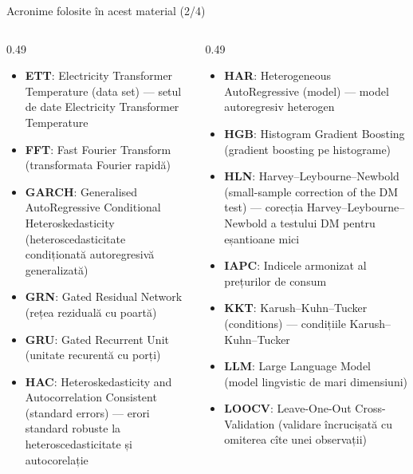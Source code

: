 \begin{frame}{Acronime folosite în acest material (2/4)}
\begin{columns}[T]
\begin{column}{0.49\textwidth}
\begin{itemize}\setlength{\itemsep}{0pt}
    \item \textbf{ETT}: Electricity Transformer Temperature (data set) — setul de date Electricity Transformer Temperature
    \item \textbf{FFT}: Fast Fourier Transform (transformata Fourier rapidă)
    \item \textbf{GARCH}: Generalised AutoRegressive Conditional Heteroskedasticity (heteroscedasticitate condiționată autoregresivă generalizată)
    \item \textbf{GRN}: Gated Residual Network (rețea reziduală cu poartă)
    \item \textbf{GRU}: Gated Recurrent Unit (unitate recurentă cu porți)
    \item \textbf{HAC}: Heteroskedasticity and Autocorrelation Consistent (standard errors) — erori standard robuste la heteroscedasticitate și autocorelație
\end{itemize}
\end{column}
\begin{column}{0.49\textwidth}
\begin{itemize}\setlength{\itemsep}{0pt}
    \item \textbf{HAR}: Heterogeneous AutoRegressive (model) — model autoregresiv heterogen
    \item \textbf{HGB}: Histogram Gradient Boosting (gradient boosting pe histograme)
    \item \textbf{HLN}: Harvey–Leybourne–Newbold (small-sample correction of the DM test) — corecția Harvey–Leybourne–Newbold a testului DM pentru eșantioane mici
    \item \textbf{IAPC}: Indicele armonizat al prețurilor de consum
    \item \textbf{KKT}: Karush–Kuhn–Tucker (conditions) — condițiile Karush–Kuhn–Tucker
    \item \textbf{LLM}: Large Language Model (model lingvistic de mari dimensiuni)
    \item \textbf{LOOCV}: Leave-One-Out Cross-Validation (validare încrucișată cu omiterea cîte unei observații)
\end{itemize}
\end{column}
\end{columns}
\end{frame}
